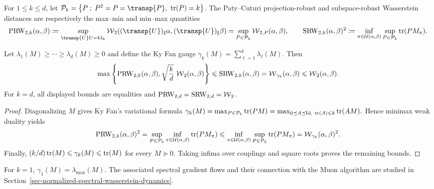 \begin{defn}\label{def-projection-subspace-robust-wasserstein}
For $1\leq k\leq d$, let
$\mathcal P_k=\enscond{P}{P^2=P=\transp{P},\ \tr(P)=k}$.
The Paty--Cuturi projection-robust and subspace-robust Wasserstein distances are respectively the max--min and min--max quantities
\[
\PRW_{2,k}(\alpha,\beta)
\eqdef
\sup_{\transp{U}U=\Id_k}
\Wass_2((\transp{U})_\sharp\alpha,(\transp{U})_\sharp\beta)
=
\sup_{P\in\mathcal P_k}\Wass_{2,P}(\alpha,\beta),
\qquad
\SRW_{2,k}(\alpha,\beta)^2
\eqdef
\inf_{\pi\in\Couplings(\alpha,\beta)}
\sup_{P\in\mathcal P_k}\tr(PM_\pi).
\]
\end{defn}
\begin{prop}\label{prop-ky-fan-srw-comparison}
Let $\lambda_1(M)\geq\cdots\geq\lambda_d(M)\geq0$ and define the Ky Fan gauge $\gamma_k(M)=\sum_{\ell=1}^k\lambda_\ell(M)$. Then
\[
\max\left\{\operatorname{PRW}_{2,k}(\alpha,\beta),\sqrt{\frac{k}{d}}\,\operatorname{\mathcal{W}}_2(\alpha,\beta)\right\}
\leqslant
\operatorname{SRW}_{2,k}(\alpha,\beta)
=\operatorname{\mathcal{W}}_{\gamma_k}(\alpha,\beta)
\leqslant
\operatorname{\mathcal{W}}_2(\alpha,\beta).
\]
For $k=d$, all displayed bounds are equalities and $\operatorname{PRW}_{2,d}=\operatorname{SRW}_{2,d}=\operatorname{\mathcal{W}}_2$.
\end{prop}
\begin{proof}
Diagonalizing $M$ gives Ky Fan's variational formula
\(\gamma_k(M) = \max_{P\in\mathcal P_k}\operatorname{tr}(PM) = \max_{0\preceq A\preceq\mathrm{Id},\ \operatorname{tr}(A)\leqslant k}\operatorname{tr}(AM).\)
Hence minimax weak duality yields
\[
\operatorname{PRW}_{2,k}(\alpha,\beta)^2
=
\sup_{P\in\mathcal P_k}\inf_{\pi\in\mathcal{U}(\alpha,\beta)}\operatorname{tr}(PM_\pi)
\leqslant
\inf_{\pi\in\mathcal{U}(\alpha,\beta)}\sup_{P\in\mathcal P_k}\operatorname{tr}(PM_\pi)
=
\operatorname{\mathcal{W}}_{\gamma_k}(\alpha,\beta)^2.
\]
Finally, $(k/d)\operatorname{tr}(M)\leqslant\gamma_k(M)\leqslant\operatorname{tr}(M)$ for every $M\succeq0$. Taking infima over couplings and square roots proves the remaining bounds.
\end{proof}
For $k=1$, $\gamma_1(M)=\lambda_{\max}(M)$. The associated spectral gradient flows and their connection with the Muon algorithm are studied in Section~\ref{sec-normalized-spectral-wasserstein-dynamics}.

